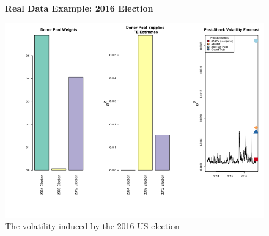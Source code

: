 \documentclass[11pt,3p,review,authoryear]{elsarticle}
\theoremstyle{definition}
\begin{document}
\begin{figure}[H]
\begin{center}
  \textbf{Real Data Example: 2016 Election}\par\medskip
  \includegraphics[scale=.5]{real_data_output_plots/FriMay311830522024_IYG_None_2016-06-22.png}
  \caption{The volatility induced by the 2016 US election}
  \label{fig:SVF_2016}
  \end{center}
\end{figure}
\end{document}
